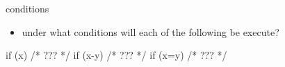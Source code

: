 \documentclass[10pt,t]{beamer}
\begin{document}
  \begin{frame}[fragile]{conditions}
    \begin{itemize}
      \item under what conditions will each of the following be execute?
    \end{itemize}
    \begin{codeblock}
    if (x) {
      /* ??? */
    }
    if (x-y) {
      /* ??? */
    }
    if (x=y) {
      /* ??? */
    }
    \end{codeblock}

  \end{frame}
\end{document}
